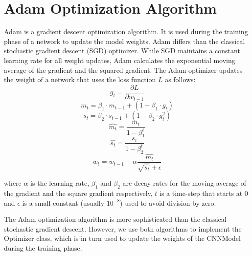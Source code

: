 \section{Adam Optimization Algorithm}\label{sec:adam_algorithm}
Adam \cite{kingma2014adam} is a gradient descent optimization algorithm. It is used during the training phase of a network to update the model weights. Adam differs than the classical stochastic gradient descent (SGD) optimizer. While SGD maintains a constant learning rate for all weight updates, Adam calculates the exponential moving average of the gradient and the squared gradient. The Adam optimizer updates the weight of a network that uses the loss function $L$ as follows:
\[g_{t}=\dfrac{\partial L}{\partial w_{t-1}}\]
\[m_{t}=\beta_{1}\cdot m_{t-1}+(1-\beta_{1}\cdot g_{t})\]
\[s_{t}=\beta_{2}\cdot s_{t-1}+(1-\beta_{2}\cdot g_{t}^2)\]
\[\hat{m_{t}}=\dfrac{m_{t}}{1 - \beta_{1}^t}\]
\[\hat{s_{t}}=\dfrac{s_{t}}{1 - \beta_{2}^t}\]
\[w_{t}=w_{t-1}-\alpha\dfrac{\hat{m_{t}}}{\sqrt{\hat{s_{t}}}+\epsilon}\]

where $\alpha$ is the learning rate, $\beta_1$ and $\beta_2$ are decay rates for the moving average of the gradient and the square gradient respectively, $t$ is a time-step that starts at 0 and $\epsilon$ is a small constant (usually $10^{-8}$) used to avoid division by zero.

The Adam optimization algorithm is more sophisticated than the classical stochastic gradient descent. However, we use both algorithms to implement the Optimizer class, which is in turn used to update the weights of the CNNModel during the training phase.
